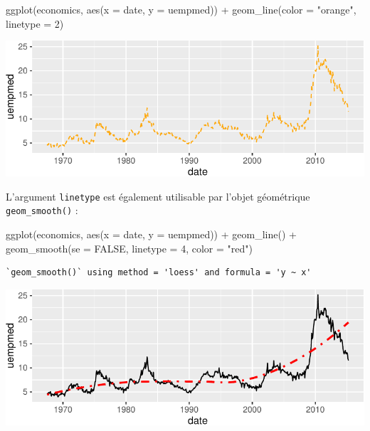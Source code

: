 \documentclass[
  a4paper,
  DIV=11,
  numbers=noendperiod,
  oneside]{scrreprt}
\newenvironment{Shaded}{}{}
\newcommand{\AttributeTok}[1]{\textcolor[rgb]{0.84,0.23,0.29}{#1}}
\newcommand{\ConstantTok}[1]{\textcolor[rgb]{0.00,0.36,0.77}{#1}}
\newcommand{\DecValTok}[1]{\textcolor[rgb]{0.00,0.36,0.77}{#1}}
\newcommand{\FunctionTok}[1]{\textcolor[rgb]{0.44,0.26,0.76}{#1}}
\newcommand{\NormalTok}[1]{\textcolor[rgb]{0.14,0.16,0.18}{#1}}
\newcommand{\SpecialCharTok}[1]{\textcolor[rgb]{0.00,0.36,0.77}{#1}}
\newcommand{\StringTok}[1]{\textcolor[rgb]{0.01,0.18,0.38}{#1}}
\begin{document}
\begin{Shaded}
\begin{Highlighting}[]
\FunctionTok{ggplot}\NormalTok{(economics, }\FunctionTok{aes}\NormalTok{(}\AttributeTok{x =}\NormalTok{ date, }\AttributeTok{y =}\NormalTok{ uempmed)) }\SpecialCharTok{+}
  \FunctionTok{geom\_line}\NormalTok{(}\AttributeTok{color =} \StringTok{"orange"}\NormalTok{, }\AttributeTok{linetype =} \DecValTok{2}\NormalTok{)}
\end{Highlighting}
\end{Shaded}

\includegraphics{03-visualization_files/figure-pdf/unnamed-chunk-52-1.pdf}

L'argument \texttt{linetype} est également utilisable par l'objet
géométrique \texttt{geom\_smooth()} :

\begin{Shaded}
\begin{Highlighting}[]
\FunctionTok{ggplot}\NormalTok{(economics, }\FunctionTok{aes}\NormalTok{(}\AttributeTok{x =}\NormalTok{ date, }\AttributeTok{y =}\NormalTok{ uempmed)) }\SpecialCharTok{+}
  \FunctionTok{geom\_line}\NormalTok{() }\SpecialCharTok{+}
  \FunctionTok{geom\_smooth}\NormalTok{(}\AttributeTok{se =} \ConstantTok{FALSE}\NormalTok{, }\AttributeTok{linetype =} \DecValTok{4}\NormalTok{, }\AttributeTok{color =} \StringTok{"red"}\NormalTok{)}
\end{Highlighting}
\end{Shaded}

\begin{verbatim}
`geom_smooth()` using method = 'loess' and formula = 'y ~ x'
\end{verbatim}

\includegraphics{03-visualization_files/figure-pdf/unnamed-chunk-53-1.pdf}
\end{document}
